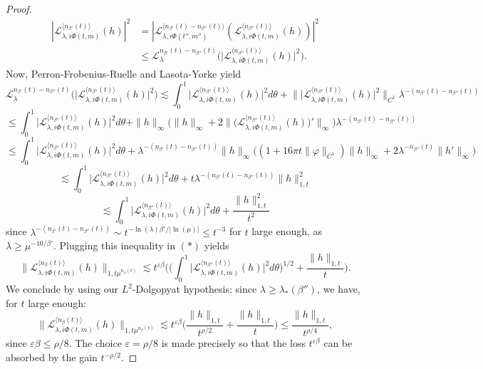 \documentclass[11pt]{amsart}
\theoremstyle{plain}
\theoremstyle{definition}
\numberwithin{equation}{section}
\begin{document}
\begin{proof}
\begin{align*} |\mathcal{L}_{\lambda,i\Phi(t,m)}^{\langle n_{\beta'}(t) \rangle}(h)|^2 &= |\mathcal{L}_{\lambda,i\Phi(t'',m'')}^{\langle n_{\beta'}(t)-n_{\beta''}(t) \rangle}( \mathcal{L}_{\lambda,i\Phi(t,m)}^{\langle n_{\beta''}(t) \rangle}(h) )|^2 \\
&\leq \mathcal{L}_\lambda^{n_{\beta'}(t)-n_{\beta''}(t)}\Big( \big| \mathcal{L}_{\lambda,i\Phi(t,m)}^{\langle n_{\beta''}(t) \rangle}(h) \big|^2 \Big).
\end{align*}
Now, Perron-Frobenius-Ruelle and Lasota-Yorke yield 
$$ \mathcal{L}_\lambda^{n_{\beta'}(t)-n_{\beta''}(t)}\Big( \big| \mathcal{L}_{\lambda,i\Phi(t,m)}^{\langle n_{\beta''}(t) \rangle}(h) \big|^2 \Big) \lesssim \int_0^1 \big| \mathcal{L}_{\lambda,i\Phi(t,m)}^{\langle n_{\beta''}(t) \rangle}(h) \big|^2 d\theta + \Big\| \big| \mathcal{L}_{\lambda,i\Phi(t,m)}^{\langle n_{\beta''}(t) \rangle}(h) \big|^2 \Big\|_{C^1} \lambda^{-(n_{\beta'}(t)-n_{\beta''}(t))}  $$
$$ \leq \int_0^1 \big| \mathcal{L}_{\lambda,i\Phi(t,m)}^{\langle n_{\beta''}(t) \rangle}(h) \big|^2 d\theta + \|h\|_\infty\Big( \|h\|_\infty+ 2\Big\| \Big(\mathcal{L}_{\lambda,i\Phi(t,m)}^{\langle n_{\beta''}(t) \rangle}(h)\Big)'\Big\|_\infty \Big) \lambda^{-(n_{\beta'}(t)-n_{\beta''}(t))} $$
$$ \leq \int_0^1 \big| \mathcal{L}_{\lambda,i\Phi(t,m)}^{\langle n_{\beta''}(t) \rangle}(h) \big|^2 d\theta + \lambda^{-(n_{\beta'}(t)-n_{\beta''}(t))} \|h\|_\infty \Big( (1+16 \pi t\|\varphi\|_{C^1})\|h\|_\infty + 2\lambda^{-n_{\beta''}(t)}\| h' \|_\infty \Big) $$
$$ \lesssim \int_0^1 \big| \mathcal{L}_{\lambda,i\Phi(t,m)}^{\langle n_{\beta''}(t) \rangle}(h) \big|^2 d\theta + t \lambda^{-(n_{\beta'}(t)-n_{\beta''}(t))} \|h\|_{1,t}^2 $$
$$ \lesssim  \int_0^1 \big| \mathcal{L}_{\lambda,i\Phi(t,m)}^{\langle n_{\beta''}(t) \rangle}(h) \big|^2 d\theta + \frac{\|h\|_{1,t}^2}{t^2} $$
since $\lambda^{-(n_{\beta'}(t)-n_{\beta''}(t))} \sim t^{- \ln(\lambda) \beta'/|\ln(\mu)| } \leq t^{-3}$ for $t$ large enough, as $\lambda \geq \mu^{-10/\beta'}$. Plugging this inequality in $(*)$ yields
$$ \|\mathcal{L}_{\lambda,i\Phi(t,m)}^{\langle n_\beta(t) \rangle}(h)\|_{1,t \mu^{n_\beta(t)}} \lesssim t^{\varepsilon \beta} \Bigg( \Big(\int_0^1 \big| \mathcal{L}_{\lambda,i\Phi(t,m)}^{\langle n_{\beta''}(t) \rangle}(h) \big|^2 d\theta\Big)^{1/2} +  \frac{\|h\|_{1,t}}{t} \Bigg). $$
We conclude by using our $L^2$-Dolgopyat hypothesis: since $\lambda \geq \lambda_*(\beta'')$, we have, for $t$ large enough:
$$ \|\mathcal{L}_{\lambda,i\Phi(t,m)}^{\langle n_\beta(t) \rangle}(h)\|_{1,t \mu^{n_\beta(t)}} \lesssim t^{\varepsilon \beta} \Big( \frac{ \|h\|_{1,t}}{t^{\rho/2}}  +  \frac{\|h\|_{1,t}}{t} \Big) \leq \frac{\|h\|_{1,t}}{t^{\rho/4}}, $$
since $\varepsilon \beta \leq \rho/8$. The choice $\varepsilon=\rho/8$ is made precisely so that the loss $t^{\varepsilon\beta}$ can be absorbed by the gain $t^{-\rho/2}$.
\end{proof}
\end{document}
